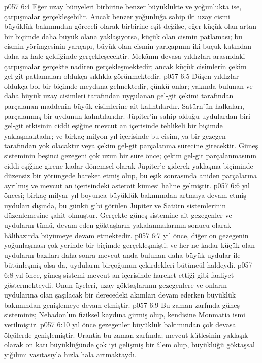 \vs p057 6:4 Eğer uzay bünyeleri birbirine benzer büyüklükte ve yoğunlukta ise, çarpışmalar gerçekleşebilir. Ancak benzer yoğunluğa sahip iki uzay cismi büyüklük bakımından göreceli olarak birbirine eşit değilse, eğer küçük olan artan bir biçimde daha büyük olana yaklaşıyorsa, küçük olan cismin patlaması; bu cismin yörüngesinin yarıçapı, büyük olan cismin yarıçapının iki buçuk katından daha az hale geldiğinde gerçekleşecektir. Mekânın devasa yıldızları arasındaki çarpışmalar gerçekte nadiren gerçekleşmektedir; ancak küçük cisimlerin çekim gel\hyp{}git patlamaları oldukça sıklıkla görünmektedir.
\vs p057 6:5 Düşen yıldızlar oldukça bol bir biçimde meydana gelmektedir, çünkü onlar; yakında bulunan ve daha büyük uzay cisimleri tarafından uygulanan gel\hyp{}git çekimi tarafından parçalanan maddenin büyük cisimlerine ait kalıntılardır. Satürn’ün halkaları, parçalanmış bir uydunun kalıntılarıdır. Jüpiter’in sahip olduğu uydulardan biri gel\hyp{}git etkisinin ciddi eşiğine mevcut an içerisinde tehlikeli bir biçimde yaklaşmaktadır; ve birkaç milyon yıl içerisinde bu cisim, ya bir gezegen tarafından yok olacaktır veya çekim gel\hyp{}git parçalanma sürecine girecektir. Güneş sisteminin beşinci gezegeni çok uzun bir süre önce; çekim gel\hyp{}git parçalanmasının ciddi eşiğine girene kadar dönemsel olarak Jüpiter’e giderek yaklaşma biçiminde düzensiz bir yörüngede hareket etmiş olup, bu eşik sonrasında aniden parçalarına ayrılmış ve mevcut an içerisindeki asteroit kümesi haline gelmiştir.
\vs p057 6:6  yıl öncesi; birkaç milyar yıl boyunca büyüklük bakımından artmaya devam etmiş uyduları dışında, bu günkü gibi görülen Jüpiter ve Satürn sistemlerinin düzenlemesine şahit olmuştur. Gerçekte güneş sistemine ait gezegenler ve uyduların tümü, devam eden göktaşların yakalanmalarının sonucu olarak hâlihazırda büyümeye devam etmektedir.
\vs p057 6:7  yıl önce, diğer on gezegenin yoğunlaşması çok yerinde bir biçimde gerçekleşmişti; ve her ne kadar küçük olan uyduların bazıları daha sonra mevcut anda bulunan daha büyük uydular ile bütünleşmiş olsa da, uyduların birçoğunun çekirdekleri bütüncül haldeydi.
\vs p057 6:8  yıl önce, güneş sistemi mevcut an içerisinde hareket ettiği gibi faaliyet göstermekteydi. Onun üyeleri, uzay göktaşlarının gezegenlere ve onların uydularına olan şaşılacak bir derecedeki akımları devam ederken büyüklük bakımından genişlemeye devam etmiştir.
\vs p057 6:9 Bu zaman zarfında güneş sisteminiz; Nebadon’un fiziksel kaydına girmiş olup, kendisine Monmatia ismi verilmiştir.
\vs p057 6:10  yıl önce gezegenler büyüklük bakımından çok devasa ölçülerde genişlemiştir. Urantia bu zaman zarfında; mevcut kütlesinin yaklaşık olarak on katı büyüklüğünde çok iyi gelişmiş bir âlem olup, büyüklüğü göktaşsal yığılımı vasıtasıyla hızla hala artmaktaydı.
